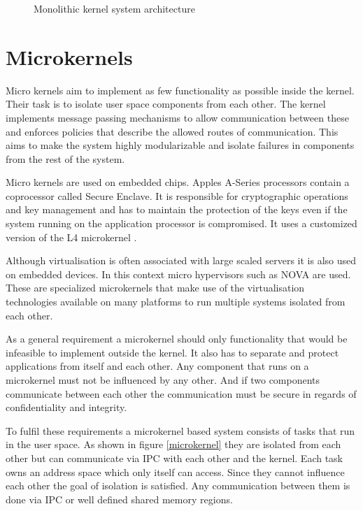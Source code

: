 \documentclass[
a4paper,
12pt,
notitlepage,
parskip=half,
DIV=11,
]{scrbook}
\begin{document}
		
		\begin{figure}
			\centering
			\def\svgwidth{0.8\textwidth}
			
			\caption{Monolithic kernel system architecture}
			\label{monolithickernel}    
		\end{figure}
		
		\section{Microkernels}
		
		Micro kernels aim to implement as few functionality as possible inside the kernel.
		Their task is to isolate user space components from each other.
		The kernel implements message passing mechanisms to allow communication between these and enforces policies that describe the allowed routes of communication.
		This aims to make the system highly modularizable and isolate failures in components from the rest of the system.
		
		Micro kernels are used on embedded chips.
		Apples A-Series processors contain a coprocessor called Secure Enclave.
		It is responsible for cryptographic operations and key management and has to maintain the protection of the keys even if the system running on the application processor is compromised.
		It uses a customized version of the L4 microkernel \citep{ios11sec} \citep{Heiser:2016:LML:2912578.2893177}.
		
		Although virtualisation is often associated with large scaled servers it is also used on embedded devices.
		In this context micro hypervisors such as NOVA \citep{Steinberg:2010:NMS:1755913.1755935} are used.
		These are specialized microkernels that make use of the virtualisation technologies available on many platforms to run multiple systems isolated from each other. \citep{ibmvirt}
		
		As a general requirement a microkernel should only functionality that would be infeasible to implement outside the kernel.
		It also has to separate and protect applications from itself and each other.
		Any component that runs on a microkernel must not be influenced by any other. And if two components communicate between each other the communication must be secure in regards of confidentiality and integrity.
		
		To fulfil these requirements a microkernel based system consists of tasks that run in the user space.
		As shown in figure \ref{microkernel} they are isolated from each other but can communicate via IPC with each other and the kernel.
		Each task owns an address space which only itself can access.
		Since they cannot influence each other the goal of isolation is satisfied.
		Any communication between them is done via IPC or well defined shared memory regions.
		
\end{document}
